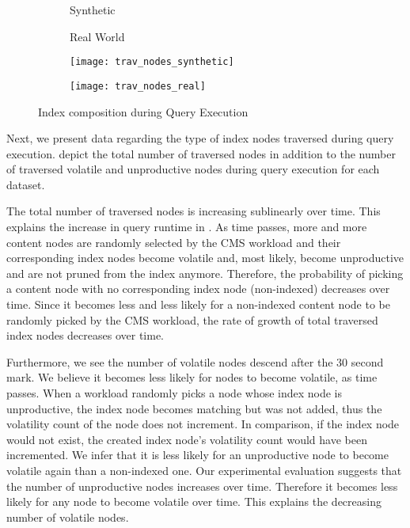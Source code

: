 \message{ !name(thesis.tex)}\documentclass[abstracton,12pt]{scrartcl}
\theoremstyle{definition}
\begin{document}
\begin{figure}
  \centering
  \begin{subfigure}{0.49\linewidth}
    \centering
    Synthetic
  \end{subfigure}
  \begin{subfigure}{0.49\linewidth}
    \centering
    Real World
  \end{subfigure}
  \begin{subfigure}{0.49\linewidth}
    \centering
    \texttt{[image: trav\_nodes\_synthetic]}
    \caption{}
    \label{fig:trav_nodes_synthetic}
  \end{subfigure}
  \begin{subfigure}{0.49\linewidth}
    \centering
    \texttt{[image: trav\_nodes\_real]}
    \caption{}
    \label{fig:trav_nodes_real}
  \end{subfigure}
  \caption{Index composition during Query Execution}
  \label{fig:trav_nodes}
\end{figure}

Next, we present data regarding the type of index nodes traversed during query
execution.
 depict
the total number of traversed nodes in addition to the number of traversed
volatile and unproductive nodes during query execution for each dataset.

The total number of traversed nodes is increasing sublinearly over time. This
explains the increase in query runtime in
.
As time passes, more and more content nodes are randomly
selected by the CMS workload and their corresponding index nodes become volatile
and, most likely, become
unproductive and are not pruned from the index anymore.
Therefore, the probability of picking a content node with no corresponding index
node (non-indexed)
decreases over time. Since it becomes less and less likely for a non-indexed content node
to be randomly picked by the CMS workload, the rate of growth of total traversed
index nodes decreases over time.

Furthermore, we see the number of volatile nodes descend after the $30$
second mark. We believe it becomes less likely for nodes to become volatile,
as time passes. When a workload randomly picks a node whose index node is
unproductive, the index
node becomes matching but was not added, thus the volatility count of the node
does not increment. In comparison, if the index node would not exist, the created
index node's volatility count would have been incremented. We infer that it is less
likely for an unproductive node to become volatile again than a non-indexed one.
Our experimental evaluation suggests that the number of
unproductive nodes increases over time. Therefore it becomes less likely for any
node to become volatile over time. This explains the decreasing number of volatile nodes.
\end{document}
